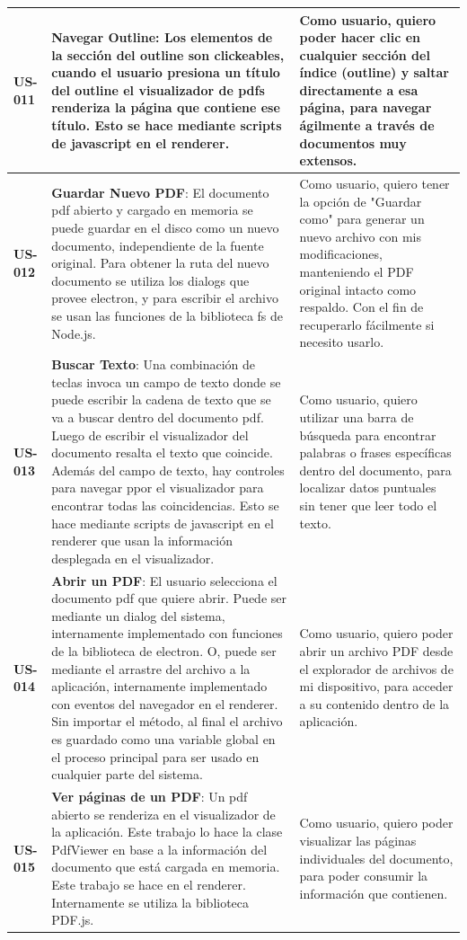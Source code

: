 \begin{longtable}{|l||p{7cm}|p{4.5cm}|}
\hline
\hline
\textbf{US-011} & \textbf{Navegar Outline}: Los elementos de la sección del outline son clickeables, cuando el usuario presiona un título del outline el visualizador de pdfs renderiza la página que contiene ese título. Esto se hace mediante scripts de javascript en el renderer. & Como usuario, quiero poder hacer clic en cualquier sección del índice (outline) y saltar directamente a esa página, para navegar ágilmente a través de documentos muy extensos.\\
\hline
\hline
\textbf{US-012} & \textbf{Guardar Nuevo PDF}:  El documento pdf abierto y cargado en memoria se puede guardar en el disco como un nuevo documento, independiente de la fuente original. Para obtener la ruta del nuevo documento se utiliza los dialogs que provee electron, y para escribir el archivo se usan las funciones de la biblioteca fs de Node.js. & Como usuario, quiero tener la opción de "Guardar como" para generar un nuevo archivo con mis modificaciones, manteniendo el PDF original intacto como respaldo. Con el fin de recuperarlo fácilmente si necesito usarlo. \\
\hline
\hline
\textbf{US-013} & \textbf{Buscar Texto}: Una combinación de teclas invoca un campo de texto donde se puede escribir la cadena de texto que se va a buscar dentro del documento pdf. Luego de escribir el visualizador del documento resalta el texto que coincide. Además del campo de texto, hay controles para navegar ppor el visualizador para encontrar todas las coincidencias. Esto se hace mediante scripts de javascript en el renderer que usan la información desplegada en el visualizador. & Como usuario, quiero utilizar una barra de búsqueda para encontrar palabras o frases específicas dentro del documento, para localizar datos puntuales sin tener que leer todo el texto.\\
\hline
\hline
\textbf{US-014} & \textbf{Abrir un PDF}:  El usuario selecciona el documento pdf que quiere abrir. Puede ser mediante un dialog del sistema, internamente implementado con funciones de la biblioteca de electron. O, puede ser mediante el arrastre del archivo a la aplicación, internamente implementado con eventos del navegador en el renderer. Sin importar el método, al final el archivo es guardado como una variable global en el proceso principal para ser usado en cualquier parte del sistema. & Como usuario, quiero poder abrir un archivo PDF desde el explorador de archivos de mi dispositivo, para acceder a su contenido dentro de la aplicación.\\
\hline
\hline
\textbf{US-015} & \textbf{Ver páginas de un PDF}:  Un pdf abierto se renderiza en el visualizador de la aplicación. Este trabajo lo hace la clase PdfViewer en base a la información del documento que está cargada en memoria. Este trabajo se hace en el renderer. Internamente se utiliza la biblioteca PDF.js. & Como usuario, quiero poder visualizar las páginas individuales del documento, para poder consumir la información que contienen.\\

\end{longtable}
